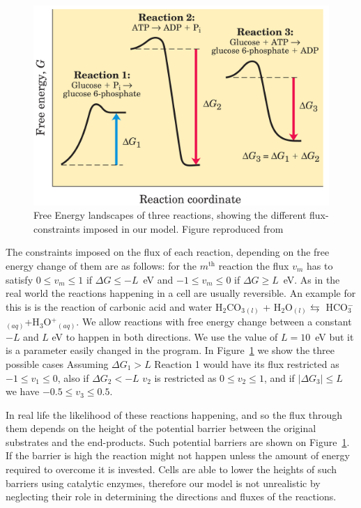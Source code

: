 \documentclass[a4paper,12pt]{article}
\begin{document}
	\begin{figure}[htpb]
		\centering
		\includegraphics[width=0.6\linewidth]{freeEchangeFig.png}
		\caption{Free Energy landscapes of three reactions, showing the different flux-constraints imposed in our model. Figure reproduced from \cite{principlesofbio}}
		\label{fig:freeEchangeFig}
	\end{figure}

	The constraints imposed on the flux of each reaction, depending on the free energy change of them are as follows: for the $m^\text{th}$ reaction the flux $v_m$ has to satisfy $0\leq v_m \leq 1 $ if $\Delta G \leq -L$~eV and $-1\leq v_m \leq 0 $ if $\Delta G \geq L$~eV. As in the real world the reactions happening in a cell are usually reversible. An example for this is is the reaction of carbonic acid and water H$_2$CO$_3$$_{(l)}$ + H$_2$O$_{(l)} \leftrightarrows$ HCO$^-_3$$_{(aq)}$+H$_3$O$^+$$_{(aq)}$. We allow reactions with free energy change between a constant $-L$ and $L$ eV to happen in both directions. We use the value of $L=10$~eV but it is a parameter easily changed in the program. In Figure~\ref{fig:freeEchangeFig} we show the three possible cases Assuming $\Delta G_1 > L$ Reaction 1 would have its flux restricted as $-1\leq v_1 \leq 0$, also if $\Delta G_2 < -L$ $v_2$ is restricted as $0 \leq v_2 \leq 1$, and if $|\Delta G_3 | \leq L$ we have $-0.5 \leq v_3 \leq 0.5$. 

	In real life the likelihood of these reactions happening, and so the flux through them depends on the height of the potential barrier between the original substrates and the end-products. Such potential barriers are shown on Figure~\ref{fig:freeEchangeFig}. If the barrier is high the reaction might not happen unless the amount of energy required to overcome it is invested. Cells are able to lower the heights of such barriers using catalytic enzymes, therefore our model is not unrealistic by neglecting their role in determining the directions and fluxes of the reactions. 
\end{document}
